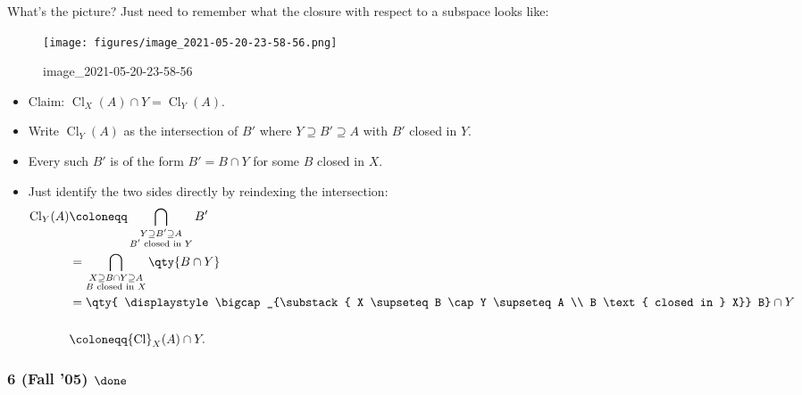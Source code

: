 \begin{strategy}

What's the picture? Just need to remember what the closure with respect
to a subspace looks like:

\begin{figure}
\centering
\texttt{[image: figures/image\_2021-05-20-23-58-56.png]}
\caption{image\_2021-05-20-23-58-56}
\end{figure}

\end{strategy}

\begin{solution}

\envlist

\begin{itemize}
\tightlist
\item
  Claim:
  \({ \operatorname{Cl}} _X(A) \cap Y = { \operatorname{Cl}} _Y(A)\).
\item
  Write \({ \operatorname{Cl}} _Y(A)\) as the intersection of \(B'\)
  where \(Y\supseteq B' \supseteq A\) with \(B'\) closed in \(Y\).
\item
  Every such \(B'\) is of the form \(B' = B \cap Y\) for some \(B\)
  closed in \(X\).
\item
  Just identify the two sides directly by reindexing the intersection:
  \begin{align*}
  { \operatorname{Cl}} _Y(A) 
  &\coloneqq\displaystyle\bigcap_{\substack{ Y\supseteq B' \supseteq A \\ B' \text{ closed in } Y}} B' \\
  &= \displaystyle\bigcap_{\substack{ X \supseteq B \cap Y \supseteq A \\ B \text{ closed in } X}} \qty{ B \cap Y } \\
  &= \qty{ \displaystyle\bigcap_{\substack{ X \supseteq B \cap Y \supseteq A \\ B \text{ closed in } X}} B} \cap Y \\ \\
  &\coloneqq{ \operatorname{Cl}} _X(A) \cap Y
  .\end{align*}
\end{itemize}

\end{solution}

\hypertarget{fall-05-done}{%
\subsubsection{\texorpdfstring{6 (Fall '05)
\(\done\)}{6 (Fall '05) \textbackslash done}}\label{fall-05-done}}

